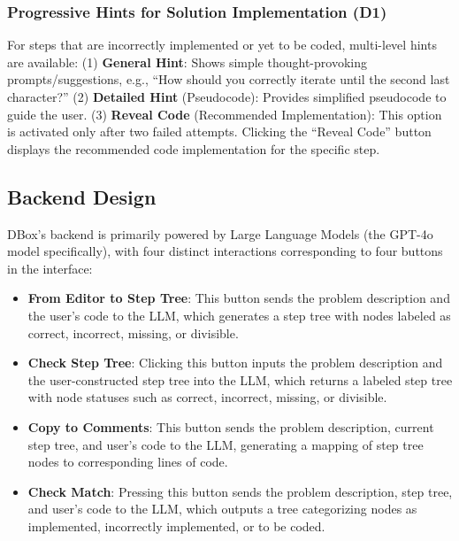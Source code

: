 \subsubsection{Progressive Hints for Solution Implementation (D1)}
For steps that are incorrectly implemented or yet to be coded, multi-level hints are available: (1) \textbf{General Hint}: Shows simple thought-provoking prompts/suggestions, e.g., ``How should you correctly iterate until the second last character?'' (2) \textbf{Detailed Hint} (Pseudocode): Provides simplified pseudocode to guide the user. (3) \textbf{Reveal Code} (Recommended Implementation): This option is activated only after two failed attempts. Clicking the ``Reveal Code'' button displays the recommended code implementation for the specific step.




\subsection{Backend Design}
DBox's backend is primarily powered by Large Language Models (the GPT-4o model specifically), with four distinct interactions corresponding to four buttons in the interface:
\begin{itemize}
    \item \textbf{From Editor to Step Tree}: This button sends the problem description and the user’s code to the LLM, which generates a step tree with nodes labeled as correct, incorrect, missing, or divisible.
    \item \textbf{Check Step Tree}: Clicking this button inputs the problem description and the user-constructed step tree into the LLM, which returns a labeled step tree with node statuses such as correct, incorrect, missing, or divisible.
    \item \textbf{Copy to Comments}: This button sends the problem description, current step tree, and user’s code to the LLM, generating a mapping of step tree nodes to corresponding lines of code.
    \item \textbf{Check Match}: Pressing this button sends the problem description, step tree, and user’s code to the LLM, which outputs a tree categorizing nodes as implemented, incorrectly implemented, or to be coded.
\end{itemize}

